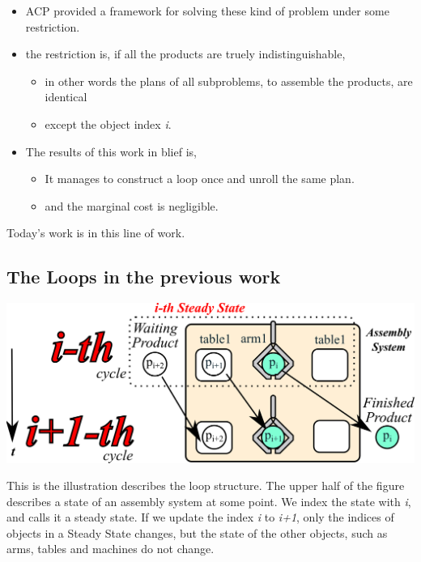 \begin{resume}
\begin{itemize}
\item ACP provided a framework for solving these kind of problem under some restriction.
\item the restriction is, if all the products are truely indistinguishable,
\begin{itemize}
\item in other words the plans of all subproblems,
to assemble the products, are identical
\item except the object index \emph{i}.
\end{itemize}
\item The results of this work in blief is,
\begin{itemize}
\item It manages to construct a loop once and unroll the same plan.
\item and the marginal cost is negligible.
\end{itemize}
\end{itemize}
Today's work is in this line of work.
\end{resume}

\subsection{The Loops in the previous work}
\label{sec-1-3}

\includegraphics[width=.9\linewidth]{img/steady-state.png}

\begin{resume}
This is the illustration describes the loop structure.
The upper half of the figure describes a state of an assembly system
at some point. We index the state with \emph{i}, and calls it a steady state.
If we update the index \emph{i} to \emph{i+1}, only the indices of objects in a Steady State
changes, but the state of the other objects, such as arms, tables and machines do
not change.
\end{resume}

